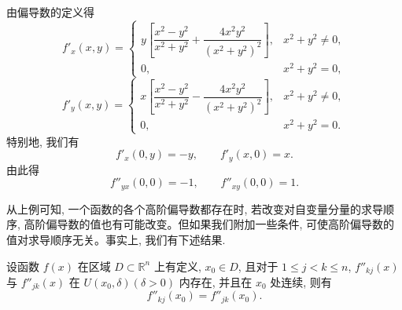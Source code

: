 \begin{solve}
由偏导数的定义得
\[
  f'_x(x,y)=
  \begin{cases}
    y\left[\dfrac{x^2-y^2}{x^2+y^2}+\dfrac{4x^2y^2}{(x^2+y^2)^2}\right], &x^2+y^2\ne0,\\
    0, &x^2+y^2=0,
  \end{cases}
\]
\[
  f'_y(x,y)=
  \begin{cases}
    x\left[\dfrac{x^2-y^2}{x^2+y^2}-\dfrac{4x^2y^2}{(x^2+y^2)^2}\right], &x^2+y^2\ne0,\\
    0, &x^2+y^2=0.
  \end{cases}
\]
特别地, 我们有
\[
  f'_x(0,y)=-y,\qquad f'_y(x,0)=x.
\]
由此得
\[
  f''_{yx}(0,0)=-1,\qquad f''_{xy}(0,0)=1.
\]

从上例可知, 一个函数的各个高阶偏导数都存在时, 若改变对自变量分量的求导顺序, 高阶偏导数的值也有可能改变。但如果我们附加一些条件, 可使高阶偏导数的值对求导顺序无关。事实上, 我们有下述结果.
\end{solve}


\begin{theorem}\label{theorem:ma-14-2-3}
设函数 $f(x)$ 在区域 $D\subset\mathbb R^n$ 上有定义, $x_0\in D$, 且对于 $1\leqslant j<k\leqslant n$, $f''_{kj}(x)$ 与 $f''_{jk}(x)$ 在 $U(x_0,\delta)(\delta>0)$ 内存在, 并且在 $x_0$ 处连续, 则有
\[
  f''_{kj}(x_0)=f''_{jk}(x_0).
\]
\end{theorem}


